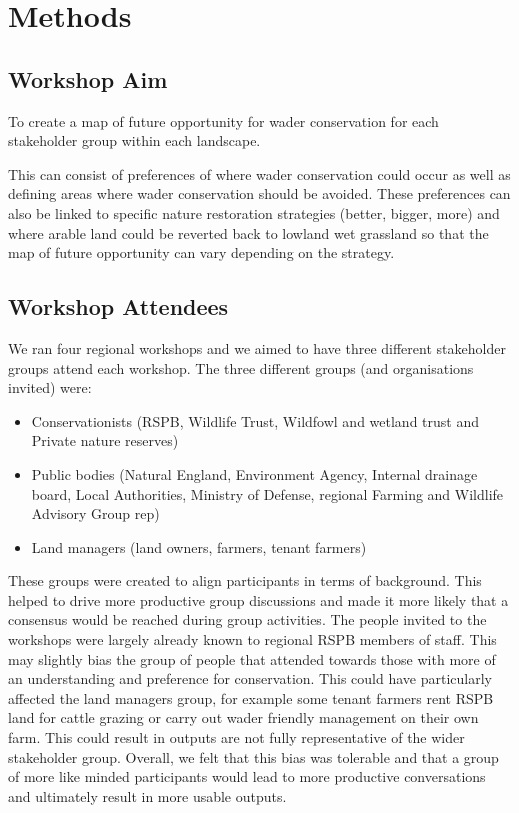 \documentclass[
  12pt,
  letterpaper,
  DIV=11,
  numbers=noendperiod]{scrartcl}
\providecommand{\tightlist}{%
  \setlength{\itemsep}{0pt}\setlength{\parskip}{0pt}}\usepackage{longtable,booktabs,array}
\begin{document}
\section{Methods}\label{methods}

\subsection{Workshop Aim}\label{workshop-aim}

To create a map of future opportunity for wader conservation for each
stakeholder group within each landscape.

This can consist of preferences of where wader conservation could occur
as well as defining areas where wader conservation should be avoided.
These preferences can also be linked to specific nature restoration
strategies (better, bigger, more) and where arable land could be
reverted back to lowland wet grassland so that the map of future
opportunity can vary depending on the strategy.

\subsection{Workshop Attendees}\label{workshop-attendees}

We ran four regional workshops and we aimed to have three different
stakeholder groups attend each workshop. The three different groups (and
organisations invited) were:

\begin{itemize}
\tightlist
\item
  Conservationists (RSPB, Wildlife Trust, Wildfowl and wetland trust and
  Private nature reserves)
\item
  Public bodies (Natural England, Environment Agency, Internal drainage
  board, Local Authorities, Ministry of Defense, regional Farming and
  Wildlife Advisory Group rep)
\item
  Land managers (land owners, farmers, tenant farmers)
\end{itemize}

These groups were created to align participants in terms of background.
This helped to drive more productive group discussions and made it more
likely that a consensus would be reached during group activities. The
people invited to the workshops were largely already known to regional
RSPB members of staff. This may slightly bias the group of people that
attended towards those with more of an understanding and preference for
conservation. This could have particularly affected the land managers
group, for example some tenant farmers rent RSPB land for cattle grazing
or carry out wader friendly management on their own farm. This could
result in outputs are not fully representative of the wider stakeholder
group. Overall, we felt that this bias was tolerable and that a group of
more like minded participants would lead to more productive
conversations and ultimately result in more usable outputs.
\end{document}
